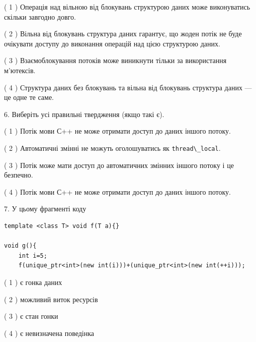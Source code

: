 \documentclass[12pt, ukrainian]{article}
\def\code#1{\Verb!#1!}
\begin{document}
\begin {large}
{( 1 ) Операція над вільною від блокувань структурою даних може виконуватись скільки завгодно довго.%

( 2 ) Вільна від блокувань структура даних гарантує, що жоден потік не буде очікувати доступу до виконання операцій над цією структурою даних.%

( 3 ) Взаємоблокування потоків може виникнути тільки за використання м’ютексів.%

( 4 ) Структура даних без блокувань та вільна від блокувань структура даних --- це одне те саме.%
\newpage



\vspace{5mm}
6. Виберіть усі правильні твердження (якщо такі є).\par
\vspace{2mm}

( 1 ) Потік мови С++ не може отримати доступ до даних іншого потоку.%

( 2 ) Автоматичні змінні не можуть оголошуватись як \code{thread\_local}.%

( 3 ) Потік може мати доступ до автоматичних змінних іншого потоку і це безпечно.%

( 4 ) Потік мови С++ не може отримати доступ до даних іншого потоку.%


\vspace{5mm}
7. У цьому фрагменті коду
\begin{verbatim}
template <class T> void f(T a){}

void g(){
    int i=5;
    f(unique_ptr<int>(new int(i)))+(unique_ptr<int>(new int(++i)));
\end{verbatim}
( 1 ) є гонка даних%

( 2 ) можливий виток ресурсів%

( 3 ) є стан гонки%

( 4 ) є невизначена поведінка%
}
\end {large}
\end{document}
